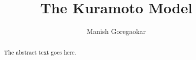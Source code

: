 \documentclass{article}
\begin{document}
\title{The Kuramoto Model}
\author{Manish Goregaokar}

\maketitle

\begin{abstract}
The abstract text goes here.
\end{abstract}
\end{document}
